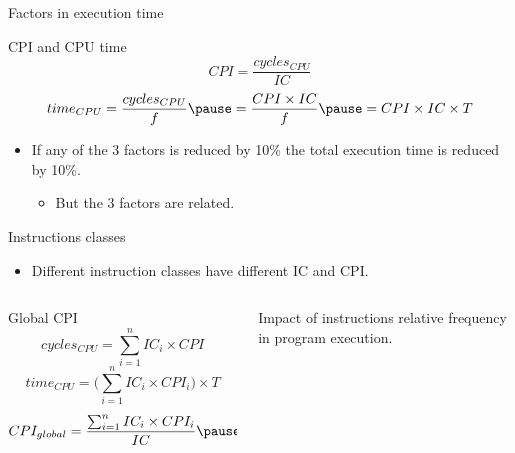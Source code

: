 \begin{frame}[t]{Factors in execution time}
\begin{block}{CPI and CPU time}
\begin{displaymath}
CPI=\frac{cycles_{CPU}}{IC}
\end{displaymath}
\pause
\begin{displaymath}
time_{CPU}=
\frac{cycles_{CPU}}{f} \pause =
\frac{CPI \times IC}{f} \pause =
CPI \times IC \times T
\end{displaymath}
\end{block}
\begin{itemize}
  \item If any of the 3 factors is reduced by 10\%
        the total execution time is reduced by 10\%.
    \begin{itemize}
      \item \alert{But the 3 factors are related}.
    \end{itemize}
\end{itemize}
\end{frame}

\begin{frame}[t]{Instructions classes}
\begin{itemize}
  \item Different instruction classes have different IC and CPI.
\end{itemize}
\begin{columns}
\begin{column}{.7\textwidth}
\begin{block}{Global CPI}
\begin{displaymath}
cycles_{CPU}=\sum_{i=1}^n IC_i \times CPI
\end{displaymath}
\pause
\begin{displaymath}
time_{CPU} =
\big( \sum_{i=1}^n IC_i \times CPI_i \big) \times T
\end{displaymath}
\pause
\begin{displaymath}
CPI_{global} = 
\frac
{\sum_{i=1}^n IC_i \times CPI_i}
{IC}
\pause =
\sum_{i=1}^n \frac{IC_i}{IC} \times CPI_i
\end{displaymath}
\end{block}
\end{column}
\begin{column}{.3\textwidth}
\pause
\alert{Impact of instructions relative frequency in program execution}.
\end{column}
\end{columns}
\end{frame}

